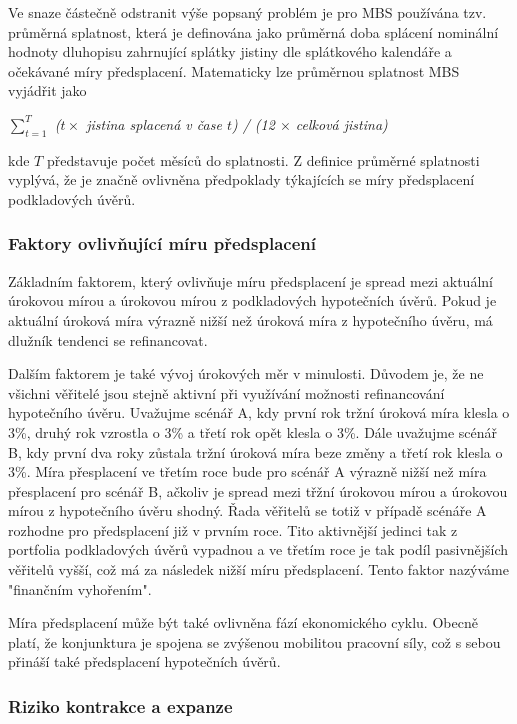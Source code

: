 \documentclass[a4paper]{book}
\begin{document}
Ve snaze částečně odstranit výše popsaný problém je pro MBS používána tzv. průměrná splatnost, která je definována jako průměrná doba splácení nominální hodnoty dluhopisu zahrnující splátky jistiny dle splátkového kalendáře a očekávané míry předsplacení. Matematicky lze průměrnou splatnost MBS vyjádřit jako
\begin{center}
\textit{$\sum_{t=1}^T$ ($t \times $ jistina splacená v čase $t$) / (12 $\times$ celková jistina)}
\end{center}
kde $T$ představuje počet měsíců do splatnosti. Z definice průměrné splatnosti vyplývá, že je značně ovlivněna předpoklady týkajících se míry předsplacení podkladových úvěrů.

\subsubsection{Faktory ovlivňující míru předsplacení}

Základním faktorem, který ovlivňuje míru předsplacení je spread mezi aktuální úrokovou mírou a úrokovou mírou z podkladových hypotečních úvěrů. Pokud je aktuální úroková míra výrazně nižší než úroková míra z hypotečního úvěru, má dlužník tendenci se refinancovat. 

Dalším faktorem je také vývoj úrokových měr v minulosti. Důvodem je, že ne všichni věřitelé jsou stejně aktivní při využívání možnosti refinancování hypotečního úvěru. Uvažujme scénář A, kdy první rok tržní úroková míra klesla o 3\%, druhý rok vzrostla o 3\% a třetí rok opět klesla o 3\%. Dále uvažujme scénář B, kdy první dva roky zůstala tržní úroková míra beze změny a třetí rok klesla o 3\%. Míra přesplacení ve třetím roce bude pro scénář A výrazně nižší než míra přesplacení pro scénář B, ačkoliv je spread mezi třžní úrokovou mírou a úrokovou mírou z hypotečního úvěru shodný. Řada věřitelů se totiž v případě scénáře A rozhodne pro předsplacení již v prvním roce. Tito aktivnější jedinci tak z portfolia podkladových úvěrů vypadnou a ve třetím roce je tak podíl pasivnějších věřitelů vyšší, což má za následek nižší míru předsplacení. Tento faktor nazýváme "finančním vyhořením".

Míra předsplacení může být také ovlivněna fází ekonomického cyklu. Obecně platí, že konjunktura je spojena se zvýšenou mobilitou pracovní síly, což s sebou přináší také předsplacení hypotečních úvěrů.

\subsubsection{Riziko kontrakce a expanze}
\end{document}

